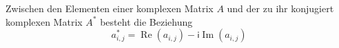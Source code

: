 Zwischen den Elementen einer komplexen Matrix $A$ und der zu ihr konjugiert komplexen Matrix $A^*$ besteht die Beziehung 
$$a_{i,j}^* = \operatorname{Re}(a_{i,j}) - \mathsf{i} \operatorname{Im}(a_{i,j})$$
